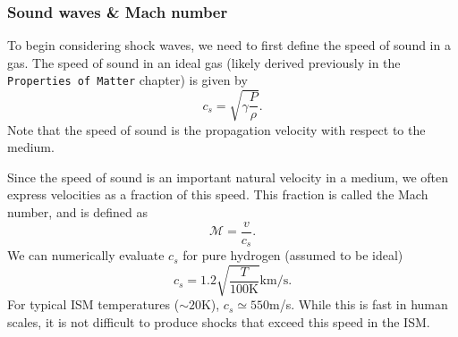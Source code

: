 \subsubsection{Sound waves \& Mach number}
To begin considering shock waves, we need to first define the speed of sound in a gas.
 The speed of sound in an ideal gas (likely derived previously in the \texttt{Properties of Matter} chapter) is given by
%
\begin{equation}
	c_s = \sqrt{\gamma \frac{P}{\rho}}.
	\label{eq:AP:sound_speed_ideal}
\end{equation}
%
Note that the speed of sound is the propagation velocity with respect to the medium.
\par 
Since the speed of sound is an important natural velocity in a medium, we often express velocities as a fraction of this speed.
 This fraction is called the Mach number, and is defined as
%
\begin{equation}
	\mathcal{M} = \frac{v}{c_s}.
	\label{eq:AP:mach_number}
\end{equation}
%
We can numerically evaluate \(c_s\) for pure hydrogen (assumed to be ideal)
%
\begin{equation}
	c_s = 1.2 \sqrt{\frac{T}{100 \text{K}}} \text{km/s}.
	\label{eq:AP:speed_sound_hydrogen}
\end{equation}
%
For typical ISM temperatures (\(\sim 20 \text{K}\)), \(c_s \simeq 550\)m/s.
 While this is fast in human scales, it is not difficult to produce shocks that exceed this speed in the ISM.
%
